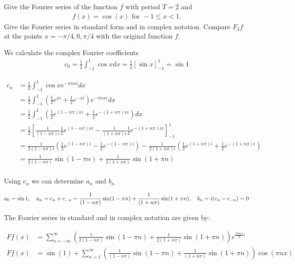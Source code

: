 \documentclass[11pt]{article}
\begin{document}
\begin{exercise}
    Give the Fourier series of the function $f$ with period $T = 2$ and 
    \begin{gather*}
        f(x) = \cos(x) \text{ for } -1 \leq x < 1.
    \end{gather*}
    Give the Fourier series in standard form and in complex notation. 
    Compare $F_3 f$ at the points $x = -\pi/4, 0, \pi/4$ with the original function $f$.
\end{exercise}
\begin{solution}    
We calculate the complex Fourier coefficients 
\begin{align*}
c_0 = \frac 1 2 \int_{-1}^1 \cos x dx = \frac 1 2 [\sin x]_{-1}^1 = \sin 1
\end{align*}

\begin{align*}
c_n &= \frac 1 2 \int_{-1}^1 \cos x e^{-\pi n x i} dx\\
&= \frac 1 2 \int_{-1}^1 \left(\frac 1 2 e^{x i} + \frac 1 2 e^{-x i} \right) e^{-\pi n x i} dx\\
&= \frac 1 2 \int_{-1}^1 \left(\frac 1 2 e^{(1-n\pi)x i} + \frac 1 2 e^{-(1+n\pi)x i} \right) dx\\
&= \frac 1 2\left[\frac{1}{(1-n\pi) i}\frac 1 2 e^{(1-n\pi)x i} - \frac{1}{(1+n\pi) i}\frac 1 2 e^{-(1+n\pi)x i} \right]_{-1}^1\\
&= \frac{1}{2(1-n\pi) i}\left( \frac 1 2 e^{(1-n\pi)i}- \frac 1 2 e^{-(1-n\pi) i}\right) - \frac{1}{2(1+n\pi) i}\left( \frac 1 2 e^{(1+n\pi)i}+ \frac 1 2 e^{-(1+n\pi) i}\right)\\
&= \frac{1}{2(1-n\pi)}\sin(1-\pi n) + \frac{1}{2(1+n\pi)}\sin(1+\pi n)\\
\end{align*}

Using $c_n$ we can determine $a_n$ and $b_n$

$$
a_0 = \sin 1,\quad a_n = c_n + c_{-n} = \frac{1}{(1-n\pi)}\sin(1-\pi n) + \frac{1}{(1+n\pi)}\sin(1+\pi n)\\, \quad b_n = i(c_n - c_{-n}) = 0
$$

The Fourier series in standard and in complex notation are given by:

\begin{align*}
F f(x)&=\sum_{n=-\infty}^{\infty} \left(\frac{1}{2(1-n\pi)}\sin(1-\pi n) + \frac{1}{2(1+n\pi)}\sin(1+\pi n)\right) e^{\frac{2 \pi n x}{T} i}\\
F f(x)&=\sin(1)+\sum_{n=1}^{\infty} \left(  \frac{1}{(1-n\pi) }\sin(1-\pi n) + \frac{1}{(1+n\pi)}\sin(1+\pi n) \right) \cos \left(\pi n x\right)
\end{align*}


\end{solution}
\end{document}
